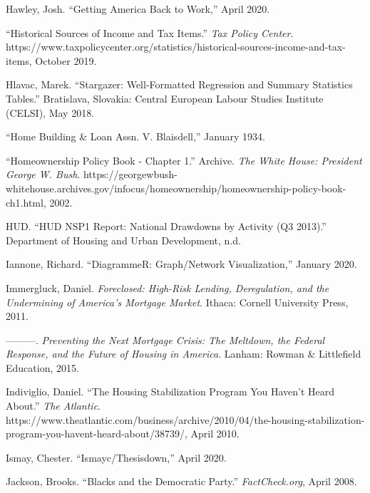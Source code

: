 \documentclass[12pt,oneside]{psthesis}
\begin{document}
\leavevmode\hypertarget{ref-hawley2020getting}{}%
Hawley, Josh. ``Getting America Back to Work,'' April 2020.

\leavevmode\hypertarget{ref-2019historical}{}%
``Historical Sources of Income and Tax Items.'' \emph{Tax Policy Center}. https://www.taxpolicycenter.org/statistics/historical-sources-income-and-tax-items, October 2019.

\leavevmode\hypertarget{ref-hlavac2018stargazer}{}%
Hlavac, Marek. ``Stargazer: Well-Formatted Regression and Summary Statistics Tables.'' Bratislava, Slovakia: Central European Labour Studies Institute (CELSI), May 2018.

\leavevmode\hypertarget{ref-1934home}{}%
``Home Building \& Loan Assn. V. Blaisdell,'' January 1934.

\leavevmode\hypertarget{ref-2002homeownership}{}%
``Homeownership Policy Book - Chapter 1.'' Archive. \emph{The White House: President George W. Bush}. https://georgewbush-whitehouse.archives.gov/infocus/homeownership/homeownership-policy-book-ch1.html, 2002.

\leavevmode\hypertarget{ref-hud2013hud}{}%
HUD. ``HUD NSP1 Report: National Drawdowns by Activity (Q3 2013).'' Department of Housing and Urban Development, n.d.

\leavevmode\hypertarget{ref-iannone2020diagrammer}{}%
Iannone, Richard. ``DiagrammeR: Graph/Network Visualization,'' January 2020.

\leavevmode\hypertarget{ref-immergluck2011foreclosed}{}%
Immergluck, Daniel. \emph{Foreclosed: High-Risk Lending, Deregulation, and the Undermining of America's Mortgage Market}. Ithaca: Cornell University Press, 2011.

\leavevmode\hypertarget{ref-immergluckPreventingNextMortgage2015}{}%
---------. \emph{Preventing the Next Mortgage Crisis: The Meltdown, the Federal Response, and the Future of Housing in America}. Lanham: Rowman \& Littlefield Education, 2015.

\leavevmode\hypertarget{ref-indiviglio2010housing}{}%
Indiviglio, Daniel. ``The Housing Stabilization Program You Haven't Heard About.'' \emph{The Atlantic}. https://www.theatlantic.com/business/archive/2010/04/the-housing-stabilization-program-you-havent-heard-about/38739/, April 2010.

\leavevmode\hypertarget{ref-ismay2020ismayc}{}%
Ismay, Chester. ``Ismayc/Thesisdown,'' April 2020.

\leavevmode\hypertarget{ref-jackson2008blacks}{}%
Jackson, Brooks. ``Blacks and the Democratic Party.'' \emph{FactCheck.org}, April 2008.
\end{document}
